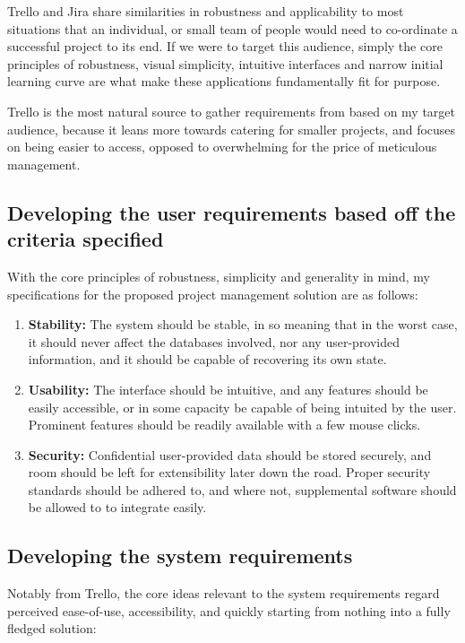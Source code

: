 \documentclass{report}
\begin{document}
	Trello and Jira share similarities in robustness and applicability to most situations that an individual, or small team
	of people would need to co-ordinate a successful project to its end. If we were to target this audience, simply the
	core principles of robustness, visual simplicity,  intuitive interfaces and narrow initial learning curve are what make
	these applications fundamentally fit for purpose.
	
	Trello is the most natural source to gather requirements from based on my target audience, because it leans more
	towards catering for smaller projects, and focuses on being easier to access, opposed to overwhelming for the price
	of meticulous management.
	
	\subsection{Developing the user requirements based off the criteria specified}
	
	With the core principles of robustness, simplicity and generality in mind, my specifications for the proposed project
	management solution are as follows:
	
	\begin{enumerate}
		\item \textbf{Stability:} The system should be stable, in so meaning that in the worst case, it should never affect
				 the databases involved, nor any user-provided information, and it should be capable of recovering its
				 own state.
		\item \textbf{Usability:} The interface should be intuitive, and any features should be easily accessible, or in some
				  capacity be capable of being intuited by the user. Prominent features should be readily available with a few
				  mouse clicks.
		\item \textbf{Security:} Confidential user-provided data should be stored securely, and room should be left for
				  extensibility later down the road. Proper security standards should be adhered to, and where not,
				  supplemental software should be allowed to to integrate easily.
	\end{enumerate}
	
	\subsection{Developing the system requirements}
	
	Notably from Trello, the core ideas relevant to the system requirements regard perceived ease-of-use, accessibility,
	and quickly starting from nothing into a fully fledged solution:
	
\end{document}
